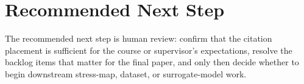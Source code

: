 \documentclass[11pt,a4paper]{article}
\begin{document}
\section{Recommended Next Step}

The recommended next step is human review: confirm that the citation placement is sufficient for
the course or supervisor's expectations, resolve the backlog items that matter for the final
paper, and only then decide whether to begin downstream stress-map, dataset, or surrogate-model
work.

\nocite{*}


\end{document}
